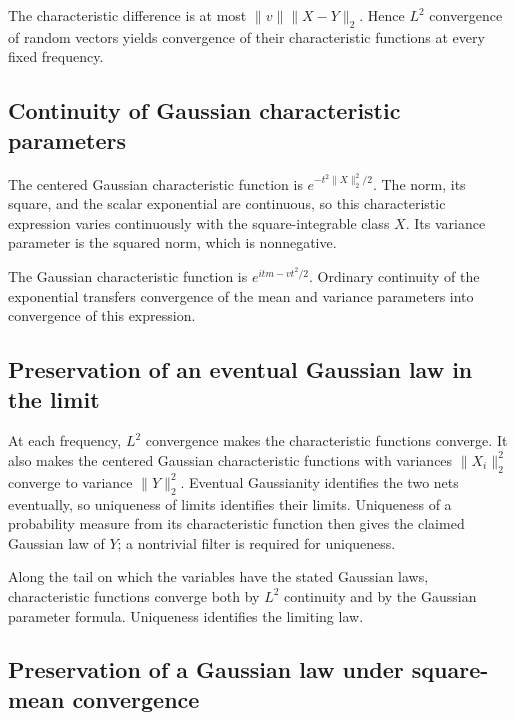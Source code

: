 \documentclass[11pt,a4paper]{report}
\begin{document}
The characteristic difference is at most \(\|v\|\|X-Y\|_2\). Hence \(L^2\) convergence of random vectors yields convergence of their characteristic functions at every fixed frequency.

\subsection{\texorpdfstring{Continuity of Gaussian characteristic parameters}{Continuity of Gaussian characteristic parameters}}
\label{report-step-UnadjustedLangevin-LpCharacteristic-lean-8}


The centered Gaussian characteristic function is \(e^{-t^2\|X\|_2^2/2}\). The norm, its square, and the scalar exponential are continuous, so this characteristic expression varies continuously with the square-integrable class \(X\). Its variance parameter is the squared norm, which is nonnegative.



The Gaussian characteristic function is \(e^{it m-vt^2/2}\). Ordinary continuity of the exponential transfers convergence of the mean and variance parameters into convergence of this expression.

\subsection{\texorpdfstring{Preservation of an eventual Gaussian law in the limit}{Preservation of an eventual Gaussian law in the limit}}
\label{report-step-UnadjustedLangevin-LpCharacteristic-lean-9}


At each frequency, \(L^2\) convergence makes the characteristic functions converge. It also makes the centered Gaussian characteristic functions with variances \(\|X_i\|_2^2\) converge to variance \(\|Y\|_2^2\). Eventual Gaussianity identifies the two nets eventually, so uniqueness of limits identifies their limits. Uniqueness of a probability measure from its characteristic function then gives the claimed Gaussian law of \(Y\); a nontrivial filter is required for uniqueness.



Along the tail on which the variables have the stated Gaussian laws, characteristic functions converge both by \(L^2\) continuity and by the Gaussian parameter formula. Uniqueness identifies the limiting law.

\subsection{\texorpdfstring{Preservation of a Gaussian law under square-mean convergence}{Preservation of a Gaussian law under square-mean convergence}}
\label{report-step-UnadjustedLangevin-LpCharacteristic-lean-10}
\end{document}
